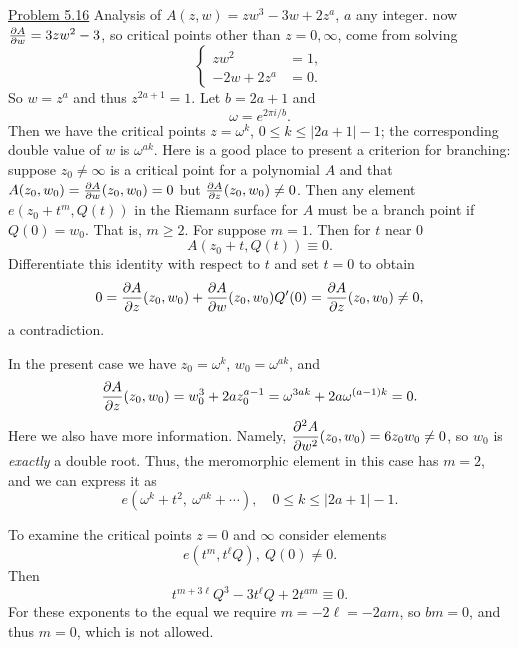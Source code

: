 \documentclass[a4paper,11pt]{article}
\begin{document}
\underline{Problem 5.16} %
Analysis of $A(z,w) = z w^3 - 3w + 2z^a$, $a$ any integer.  now
$\frac{\partial A}{\partial w} = 3zw^2 - 3$, so critical points other than $z = 0,
\infty$, come from solving
$$
\left\{
\begin{aligned}
  zw^2 &= 1,\\
  -2w + 2z^a &= 0.
\end{aligned}
\right.
$$
So $w = z^a$ and thus $z^{2a+1} = 1$.  Let $b = 2a+1$ and
$$
\omega = e^{2\pi i/b}.
$$
Then we have the critical points $z = \omega^k$, $0 \le k \le |2a+1| -
1$; the corresponding double value of $w$ is $\omega^{ak}$.  Here is a
good place to present a criterion for branching: suppose $z_0 \ne
\infty$ is a critical point for a polynomial $A$ and that $A(z_0, w_0)
= \frac{\partial A}{\partial w}(z_0, w_0) = 0$ but $\frac{\partial A}{\partial z}(z_0, w_0)
\ne 0$.  Then any element $e(z_0 + t^m, Q(t))$ in the Riemann surface
for $A$ must be a branch point if $Q(0) = w_0$.  That is, $m \ge 2$.
For suppose $m =1$.  Then for $t$ near 0
$$
A(z_0 + t, Q(t)) \equiv 0.
$$
Differentiate this identity with respect to $t$ and set $t = 0$ to
obtain
$$
0 = \frac{\partial A}{\partial z}(z_0, w_0) + \frac{\partial A}{\partial w}(z_0, w_0) Q'(0)
= \frac{\partial A}{\partial z}(z_0, w_0) \ne 0,
$$
a contradiction.

In the present case we have $z_0 = \omega^k$, $w_0 = \omega^{ak}$, and
$$
\frac{\partial A}{\partial z}(z_0, w_0) = w_0^3 + 2az_0^{a-1}
= \omega^{3ak} + 2a\omega^{(a-1)k} = 0.
$$
Here we also have more information.  Namely, $\displaystyle \frac{\partial^2 A}{\partial
  w^2}(z_0, w_0) = 6z_0 w_0 \ne 0$, so $w_0$ is \emph{exactly} a
double root.  Thus, the meromorphic element in this case has $m = 2$,
and we can express it as
$$
e(\omega^k + t^2,\ \omega^{ak} + \cdots),\quad
0 \le k \le |2a+1|-1.
$$

To examine the critical points $z = 0$ and $\infty$ consider elements
$$
e(t^m, t^\ell Q),\ Q(0) \ne 0.
$$
Then
$$
t^{m + 3\ell} Q^3 - 3t^\ell Q + 2t^{am} \equiv 0.
$$
For these exponents to the equal we require $m = -2\ell = -2am$, so
$bm = 0$, and thus $m = 0$, which is not allowed.
\end{document}
